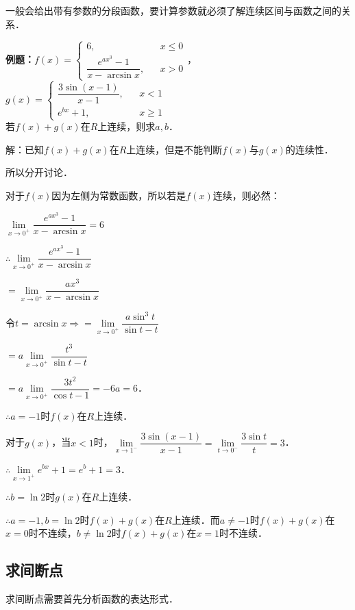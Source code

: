 一般会给出带有参数的分段函数，要计算参数就必须了解连续区间与函数之间的关系．

\textbf{例题：}$f(x)=\left\{\begin{array}{lcl}
        6,                               &  & x\leqslant 0 \\
        \dfrac{e^{ax^3}-1}{x-\arcsin x}, &  & x>0
    \end{array}
    \right.$，$g(x)=\left\{\begin{array}{lcl}
        \dfrac{3\sin(x-1)}{x-1}, &  & x<1          \\
        e^{bx}+1,                &  & x\geqslant 1
    \end{array}
    \right.$ \\ 若$f(x)+g(x)$在$R$上连续，则求$a,b$．

解：已知$f(x)+g(x)$在$R$上连续，但是不能判断$f(x)$与$g(x)$的连续性．

所以分开讨论．

对于$f(x)$因为左侧为常数函数，所以若是$f(x)$连续，则必然：

$\lim\limits_{x\to 0^+}\dfrac{e^{ax^3}-1}{x-\arcsin x}=6$

$\therefore\lim\limits_{x\to 0^+}\dfrac{e^{ax^3}-1}{x-\arcsin x}$

$=\lim\limits_{x\to 0^+}\dfrac{ax^3}{x-\arcsin x}$

$\text{令}t=\arcsin x\Rightarrow=\lim\limits_{x\to 0^+}\dfrac{a\sin^3t}{\sin t-t}$

$=a\lim\limits_{x\to 0^+}\dfrac{t^3}{\sin t-t}$

$=a\lim\limits_{x\to 0^+}\dfrac{3t^2}{\cos t-1}=-6a=6$．

$\therefore a=-1$时$f(x)$在$R$上连续．

对于$g(x)$，当$x<1$时，$\lim\limits_{x\to 1^-}\dfrac{3\sin(x-1)}{x-1}=\lim\limits_{t\to 0^-}\dfrac{3\sin t}{t}=3$．

$\therefore\lim\limits_{x\to 1^+}e^{bx}+1=e^b+1=3$．

$\therefore b=\ln 2$时$g(x)$在$R$上连续．

$\therefore a=-1,b=\ln 2$时$f(x)+g(x)$在$R$上连续．而$a\neq -1$时$f(x)+g(x)$在$x=0$时不连续，$b\neq\ln 2$时$f(x)+g(x)$在$x=1$时不连续．

\subsection{求间断点}

求间断点需要首先分析函数的表达形式．

